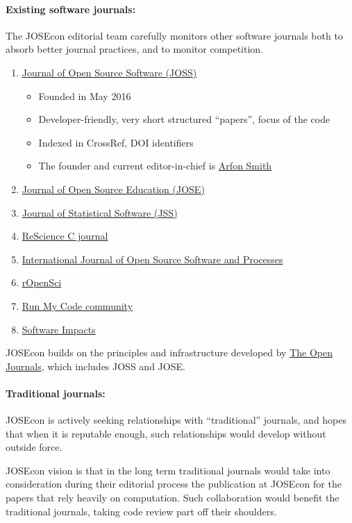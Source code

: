 \paragraph{Existing software journals:} The JOSEcon editorial team carefully monitors
other software journals both to absorb better journal practices, and to monitor 
competition. 
\begin{enumerate}
\item \href{https://joss.theoj.org}{Journal of Open Source Software (JOSS)}
\begin{itemize}
\item Founded in May 2016
\item Developer-friendly, very short structured “papers”, focus of the code
\item Indexed in CrossRef, DOI identifiers
\item The founder and current editor-in-chief is \href{http://www.arfon.org/about/}{Arfon Smith}
\end{itemize}
\item \href{https://jose.theoj.org}{Journal of Open Source Education (JOSE)}
\item \href{https://www.jstatsoft.org}{Journal of Statistical Software (JSS)}
\item \href{http://rescience.github.io}{ReScience C journal}
\item \href{https://www.igi-global.com/journal/international-journal-open-source-software/1123}{International Journal of Open Source Software and Processes}
\item \href{https://ropensci.org}{rOpenSci}
\item \href{http://www.runmycode.org}{Run My Code community}
\item \href{https://www.journals.elsevier.com/software-impacts/}{Software Impacts}
\end{enumerate}

JOSEcon builds on the principles and infrastructure developed by 
\href{http://www.theoj.org/}{The Open Journals}, which includes JOSS and JOSE. 

\paragraph{Traditional journals:}
JOSEcon is actively seeking relationships with ``traditional'' journals, and hopes that
when it is reputable enough, such relationships would develop without outside force.

JOSEcon vision is that in the long term traditional journals would take into consideration
during their editorial process the publication at JOSEcon for the papers that rely heavily 
on computation.
Such collaboration would benefit the traditional journals, taking code review part off 
their shoulders. 

